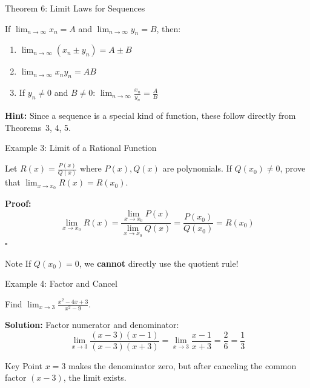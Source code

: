 \documentclass[UTF8,10pt]{beamer}
\begin{document}
\begin{frame}{Theorem 6: Limit Laws for Sequences}
\begin{theorem}
If $\displaystyle \lim_{n\to\infty} x_n = A$ and $\displaystyle \lim_{n\to\infty} y_n = B$, then:
\begin{enumerate}
    \item $\displaystyle \lim_{n\to\infty} (x_n \pm y_n) = A \pm B$
    \item $\displaystyle \lim_{n\to\infty} x_n y_n = AB$
    \item If $y_n \neq 0$ and $B \neq 0$: \; $\displaystyle \lim_{n\to\infty} \frac{x_n}{y_n} = \frac{A}{B}$
\end{enumerate}
\end{theorem}
\pause
\textbf{Hint:} Since a sequence is a special kind of function, these follow directly from
Theorems~3, 4, 5.
\end{frame}

\begin{frame}{Example 3: Limit of a Rational Function}
\begin{example}
Let $\displaystyle R(x) = \frac{P(x)}{Q(x)}$ where $P(x), Q(x)$ are polynomials.
If $Q(x_0) \neq 0$, prove that $\displaystyle \lim_{x\to x_0} R(x) = R(x_0)$.
\end{example}
\pause
\textbf{Proof:}
\[
\lim_{x\to x_0} R(x) = \frac{\lim_{x\to x_0} P(x)}{\lim_{x\to x_0} Q(x)} = \frac{P(x_0)}{Q(x_0)} = R(x_0)
\] \hfill $\square$
\pause
\vspace{0.5em}
\begin{alertblock}{Note}
If $Q(x_0) = 0$, we \textbf{cannot} directly use the quotient rule!
\end{alertblock}
\end{frame}

\begin{frame}{Example 4: Factor and Cancel}
\begin{example}
Find $\displaystyle \lim_{x\to 3} \frac{x^2-4x+3}{x^2-9}$.
\end{example}
\pause
\textbf{Solution:} Factor numerator and denominator:
\[
\lim_{x\to 3} \frac{(x-3)(x-1)}{(x-3)(x+3)} = \lim_{x\to 3} \frac{x-1}{x+3} = \frac{2}{6} = \frac{1}{3}
\]
\pause
\vspace{0.3em}
\begin{block}{Key Point}
$x=3$ makes the denominator zero, but after canceling the common factor $(x-3)$, the limit exists.
\end{block}
\end{frame}
\end{document}
